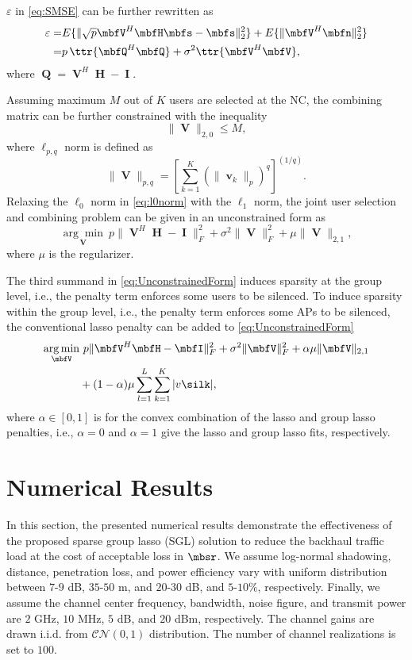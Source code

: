 \documentclass[journal]{IEEEtran}
\begin{document}
$\varepsilon$ in \eqref{eq:SMSE} can be further rewritten as
\begin{align}
\varepsilon=&E\{\|\sqrt{p}\mbfV^H\mbfH\mbfs-\mbfs\|_2^2\}+E\{\|\mbfV^H\mbfn\|_2^2\}\nonumber\\
=&p~\!\ttr\{\mbfQ^H\mbfQ\}+\sigma^2\ttr\{\mbfV^H\mbfV\},
\end{align}
where $\mbfQ=\mbfV^H\mbfH-\mbfI$.

Assuming maximum $M$ out of $K$ users are selected at the NC, the combining matrix can be further constrained with the inequality
\begin{equation}\label{eq:l0norm}
\|\mbfV\|_{2,0}\leq M,
\end{equation}
where $\ell_{p,q}$ norm is defined as 
\begin{equation}
\|\mbfV\|_{p,q}=\left[\sum_{k=1}^K(\|\mbfv_k\|_p)^q\right]^{(1/q)}.
\end{equation}
Relaxing the $\ell_0$ norm in \eqref{eq:l0norm} with the $\ell_1$ norm, the joint user selection and combining problem can be given in an unconstrained form as 
\begin{equation}\label{eq:UnconstrainedForm}
\underset{\mbfV}{\arg\min}~p\|\mbfV^H\mbfH-\mbfI\|_F^2+\sigma^2\|\mbfV\|_F^2+\mu\|\mbfV\|_{2,1},
\end{equation}
where $\mu$ is the regularizer.

The third summand in \eqref{eq:UnconstrainedForm} induces sparsity at the group level, i.e., the penalty term enforces some users to be silenced. To induce sparsity within the group level, i.e., the penalty term enforces some APs to be silenced, the conventional lasso penalty can be added to \eqref{eq:UnconstrainedForm} 
\begin{align}\label{eq:SGL}
\underset{\mbfV}{\arg\min}&~p\|\mbfV^H\mbfH-\mbfI\|_F^2+\sigma^2\|\mbfV\|_F^2+\alpha\mu\|\mbfV\|_{2,1}\nonumber\\
&+(1-\alpha)\mu\sum_{l=1}^L\sum_{k=1}^K|v\silk|,
\end{align}
where ${\alpha\in[0,1]}$ is for the convex combination of the lasso and group lasso penalties, i.e., ${\alpha=0}$ and ${\alpha=1}$ give the lasso and group lasso fits, respectively.


\section{Numerical Results} \label{sec:NumericalResults}
In this section, the presented numerical results demonstrate the effectiveness of the proposed sparse group lasso (SGL) solution to reduce the backhaul traffic load at the cost of acceptable loss in $\mbsr$. We assume log-normal shadowing, distance, penetration loss, and power efficiency vary with uniform distribution between $7\text{-}9$ dB, $35\text{-}50$ m, and $20\text{-}30$ dB, and $5\text{-}10\%$, respectively. Finally, we assume the channel center frequency, bandwidth, noise figure, and transmit power are $2$ GHz, $10$ MHz, $5$ dB, and $20$ dBm, respectively. The channel gains are drawn i.i.d. from ${\mathcal{CN}(0,1)}$ distribution. The number of channel realizations is set to $100$. 
\end{document}
